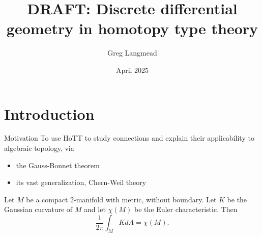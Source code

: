 \documentclass[14pt,aspectratio=169]{beamer}
\title[Geometry in HoTT]{DRAFT: Discrete differential geometry in homotopy type theory}
\author{Greg Langmead}
\institute[CMU]{Carnegie Mellon University}
\date{April 2025}
\begin{document}
\begin{frame}
\titlepage
\end{frame}


\section{Introduction}

\begin{frame}{Motivation}
To use HoTT to study \alert{connections} and \alert{explain} their applicability to algebraic topology, via
\begin{itemize}
\item the Gauss-Bonnet theorem
\item its vast generalization, Chern-Weil theory
\end{itemize}
\end{frame}

\begin{frame}
\begin{theorem}
Let \( M \) be a compact 2-manifold with metric, without boundary. Let \( K \) be the Gaussian curvature of \( M \) and let \( \chi(M) \) be the Euler characteristic. Then \[\frac{1}{2\pi}\int_M K dA=\chi(M).\]
\end{theorem}
\end{frame}
\end{document}

